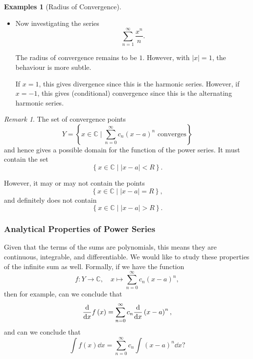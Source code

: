 \documentclass[11pt]{article}
\numberwithin{equation}{section}
\theoremstyle{definition}
\newtheorem{examples}[theorem]{Examples}
\theoremstyle{remark}
\newtheorem{remark}[theorem]{Remark}
\newcommand{\pqty}[1]{\left(#1\right)}
\newcommand{\abs}[1]{\left|#1\right|}
\newcommand{\set}[2]{\left\{#1\mid #2\right\}}
\newcommand{\function}[5]{#1:#2\to #3,\quad #4\mapsto #5}
\newcommand{\CC}{\mathbb C}
\begin{document}
\begin{examples}[Radius of Convergence]
\begin{itemize}
        \item Now investigating the series
        \[
            \sum_{n = 1}^{\infty} \frac{x^n}{n}.
        \]

        The radius of convergence remains to be \(1\). However, with \(\abs{x} = 1\), the behaviour is more subtle.

        If \(x = 1\), this gives divergence since this is the harmonic series. However, if \(x = -1\), this gives (conditional) convergence since this is the alternating harmonic series.
    \end{itemize}
\end{examples}

\begin{remark}\label{analysis-unit-0210}
    The set of convergence points
    \[
        Y = \set{x \in \CC}{\sum_{n = 0}^{\infty} c_n \pqty{x - a}^n \text{ converges}}
    \]
    and hence gives a possible domain for the function of the power series. It must contain the set
    \[
        \set{x \in \CC}{\abs{x - a} < R}.
    \]

    However, it may or may not contain the points
    \[
        \set{x \in \CC}{\abs{x - a} = R},
    \]
    and definitely does not contain
    \[
        \set{x \in \CC}{\abs{x - a} > R}.
    \]
\end{remark}

\subsubsection{Analytical Properties of Power Series}

Given that the terms of the sums are polynomials, this means they are continuous, integrable, and differentiable. We would like to study these properties of the infinite sum as well. Formally, if we have the function
\[
    \function{f}{Y}{\CC}{x}{\sum_{n = 0}^{\infty} c_n \pqty{x - a}^n,}
\]
then for example, can we conclude that
\[
    \dv{x} f\pqty{x} = \sum_{n = 0}^{\infty} c_n \dv{x} \pqty{x - a}^n,
\]
and can we conclude that
\[
    \int f\pqty{x} \dd{x} = \sum_{n = 0}^{\infty} c_n \int \pqty{x - a}^{n} \dd{x}?
\]
\end{document}
